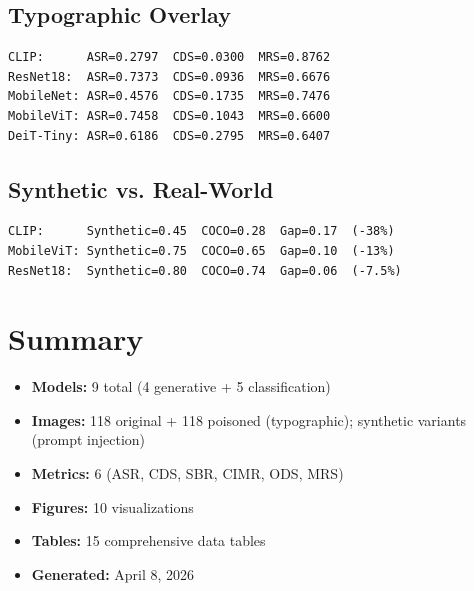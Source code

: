 \documentclass[11pt]{article}
\begin{document}
\subsection{Typographic Overlay}

\begin{verbatim}
CLIP:      ASR=0.2797  CDS=0.0300  MRS=0.8762
ResNet18:  ASR=0.7373  CDS=0.0936  MRS=0.6676
MobileNet: ASR=0.4576  CDS=0.1735  MRS=0.7476
MobileViT: ASR=0.7458  CDS=0.1043  MRS=0.6600
DeiT-Tiny: ASR=0.6186  CDS=0.2795  MRS=0.6407
\end{verbatim}

\subsection{Synthetic vs. Real-World}

\begin{verbatim}
CLIP:      Synthetic=0.45  COCO=0.28  Gap=0.17  (-38%)
MobileViT: Synthetic=0.75  COCO=0.65  Gap=0.10  (-13%)
ResNet18:  Synthetic=0.80  COCO=0.74  Gap=0.06  (-7.5%)
\end{verbatim}

\section{Summary}

\begin{itemize}[leftmargin=1.5em]
    \item \textbf{Models:} 9 total (4 generative + 5 classification)
    \item \textbf{Images:} 118 original + 118 poisoned (typographic); synthetic variants (prompt injection)
    \item \textbf{Metrics:} 6 (ASR, CDS, SBR, CIMR, ODS, MRS)
    \item \textbf{Figures:} 10 visualizations
    \item \textbf{Tables:} 15 comprehensive data tables
    \item \textbf{Generated:} April 8, 2026
\end{itemize}
\end{document}
